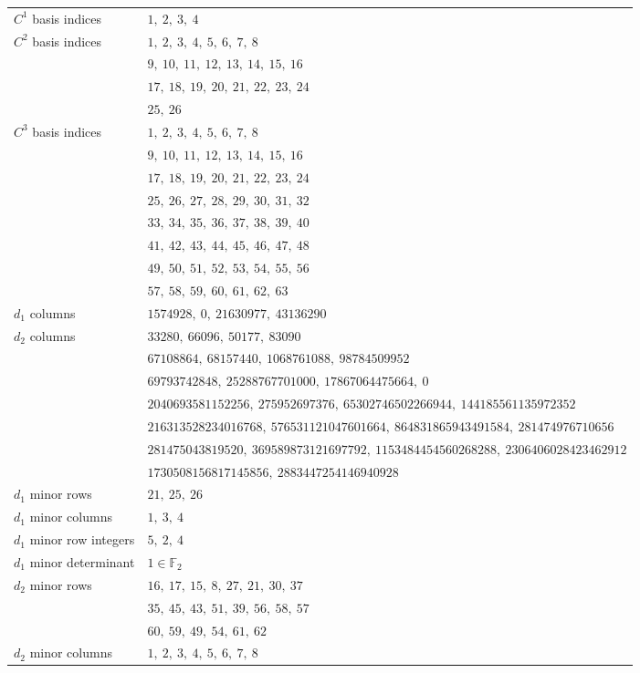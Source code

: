 \begin{longtable}{l l}
\endhead
$C^{1}$ basis indices & $1,\ 2,\ 3,\ 4$\\
$C^{2}$ basis indices & $1,\ 2,\ 3,\ 4,\ 5,\ 6,\ 7,\ 8$\\
 & $9,\ 10,\ 11,\ 12,\ 13,\ 14,\ 15,\ 16$\\
 & $17,\ 18,\ 19,\ 20,\ 21,\ 22,\ 23,\ 24$\\
 & $25,\ 26$\\
$C^{3}$ basis indices & $1,\ 2,\ 3,\ 4,\ 5,\ 6,\ 7,\ 8$\\
 & $9,\ 10,\ 11,\ 12,\ 13,\ 14,\ 15,\ 16$\\
 & $17,\ 18,\ 19,\ 20,\ 21,\ 22,\ 23,\ 24$\\
 & $25,\ 26,\ 27,\ 28,\ 29,\ 30,\ 31,\ 32$\\
 & $33,\ 34,\ 35,\ 36,\ 37,\ 38,\ 39,\ 40$\\
 & $41,\ 42,\ 43,\ 44,\ 45,\ 46,\ 47,\ 48$\\
 & $49,\ 50,\ 51,\ 52,\ 53,\ 54,\ 55,\ 56$\\
 & $57,\ 58,\ 59,\ 60,\ 61,\ 62,\ 63$\\
$d_1$ columns & $1574928,\ 0,\ 21630977,\ 43136290$\\
$d_2$ columns & $33280,\ 66096,\ 50177,\ 83090$\\
 & $67108864,\ 68157440,\ 1068761088,\ 98784509952$\\
 & $69793742848,\ 25288767701000,\ 17867064475664,\ 0$\\
 & $2040693581152256,\ 275952697376,\ 65302746502266944,\ 144185561135972352$\\
 & $216313528234016768,\ 576531121047601664,\ 864831865943491584,\ 281474976710656$\\
 & $281475043819520,\ 369589873121697792,\ 1153484454560268288,\ 2306406028423462912$\\
 & $1730508156817145856,\ 2883447254146940928$\\
$d_1$ minor rows & $21,\ 25,\ 26$\\
$d_1$ minor columns & $1,\ 3,\ 4$\\
$d_1$ minor row integers & $5,\ 2,\ 4$\\
$d_1$ minor determinant & $1\in\mathbb F_2$\\
$d_2$ minor rows & $16,\ 17,\ 15,\ 8,\ 27,\ 21,\ 30,\ 37$\\
 & $35,\ 45,\ 43,\ 51,\ 39,\ 56,\ 58,\ 57$\\
 & $60,\ 59,\ 49,\ 54,\ 61,\ 62$\\
$d_2$ minor columns & $1,\ 2,\ 3,\ 4,\ 5,\ 6,\ 7,\ 8$\\

\end{longtable}
